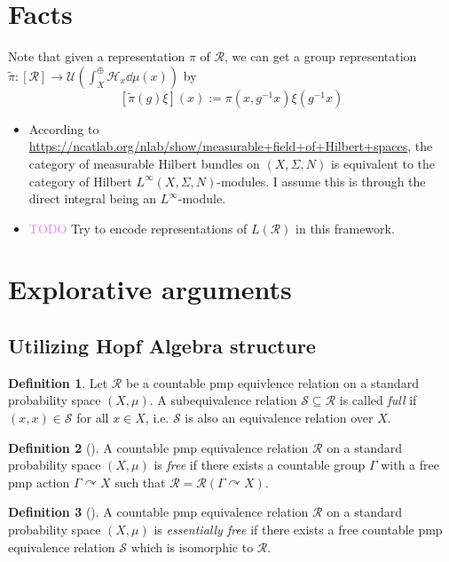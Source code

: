 \documentclass[12pt]{article}
\newcommand{\sub}{\subseteq}
\newcommand{\lr}[1]{\left(#1\right)}
\renewcommand{\H}{\mathcal{H}}
\newcommand{\acts}{\curvearrowright}
\theoremstyle{definition}
\newtheorem{definition}{Definition}[]
\theoremstyle{plain}
\theoremstyle{remark}
\begin{document}
\section{Facts}

Note that given a representation $ \pi $ of $ \mathcal{R} $, we can get a group representation $ \widetilde{\pi}:[\mathcal{R}]\to \mathcal{U}\lr{\int_{X}^{\oplus}\H_{x}\dd{\mu(x)}} $ by 
\[
    [\widetilde{\pi}(g) \xi](x) := \pi(x,g^{-1}x) \xi(g^{-1}x)
\]

\begin{itemize}
    \item According to \url{https://ncatlab.org/nlab/show/measurable+field+of+Hilbert+spaces}, the category of measurable Hilbert bundles on $ (X,\Sigma, N) $ is equivalent to the category of Hilbert $ L^{\infty}(X,\Sigma, N) $-modules. I assume this is through the direct integral being an $ L^\infty $-module.
    \item \textcolor{violet}{TODO} Try to encode representations of $ L(\mathcal{R}) $ in this framework.
\end{itemize}

\section{Explorative arguments}
\subsection{Utilizing Hopf Algebra structure}

\begin{definition}
    Let $ \mathcal{R} $ be a countable pmp equivlence relation on a standard probability space $ (X,\mu) $. A subequivalence relation $ \mathcal{S}\sub \mathcal{R} $ is called \textit{full} if $ (x,x)\in \mathcal{S} $ for all $ x\in X $, i.e. $ \mathcal{S} $ is also an equivalence relation over $ X $.
\end{definition}

\begin{definition}[\textcite{borelequivnotes}]
    A countable pmp equivalence relation $ \mathcal{R} $ on a standard probability space $ (X,\mu) $ is \textit{free} if there exists a countable group $ \Gamma $ with a free pmp action $ \Gamma \acts X $ such that $ \mathcal{R} = \mathcal{R}(\Gamma\acts X) $.
\end{definition}

\begin{definition}[\textcite{borelequivnotes}]
    A countable pmp equivalence relation $ \mathcal{R} $ on a standard probability space $ (X,\mu) $ is \textit{essentially free} if there exists a free countable pmp equivalence relation $ \mathcal{S} $ which is isomorphic to $ \mathcal{R} $.
\end{definition}
\end{document}
